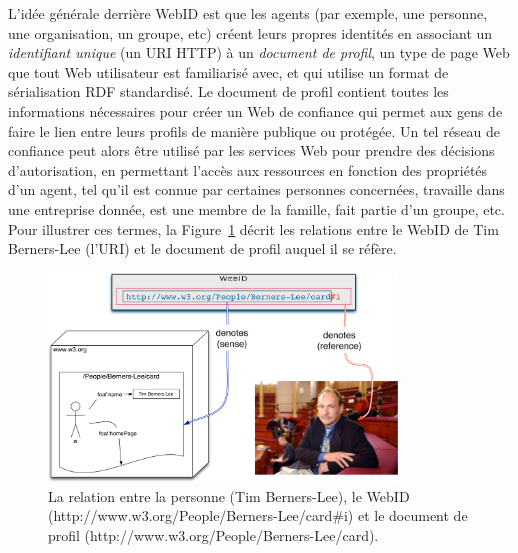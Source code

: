 \documentclass[a4paper]{article}
\begin{document}
L'idée générale derrière WebID est que les agents (par exemple, une personne, une organisation, un groupe, etc) créent leurs propres identités en associant un \textit{identifiant unique} (un URI HTTP) à un \textit{document de profil}, un type de page Web que tout Web utilisateur est familiarisé avec, et qui utilise un format de sérialisation RDF standardisé. Le document de profil contient toutes les informations nécessaires pour créer un Web de confiance qui permet aux gens de faire le lien entre leurs profils de manière publique ou protégée. Un tel réseau de confiance peut alors être utilisé par les services Web pour prendre des décisions d'autorisation, en permettant l'accès aux ressources en fonction des propriétés d'un agent, tel qu'il est connue par certaines personnes concernées, travaille dans une entreprise donnée, est une membre de la famille, fait partie d'un groupe, etc.\\

Pour illustrer ces termes, la Figure~\ref{fig:webid} décrit les relations entre le WebID de Tim Berners-Lee (l'URI) et le document de profil auquel il se réfère.

\begin{figure}[h]
  \begin{center}
    \includegraphics[width=350px]{img/WebID-overview.png}
        \caption{La relation entre la personne (Tim Berners-Lee), le WebID (http://www.w3.org/People/Berners-Lee/card\#i) et le document de profil (http://www.w3.org/People/Berners-Lee/card).}
        \label{fig:webid}
  \end{center}
\end{figure}
\end{document}
